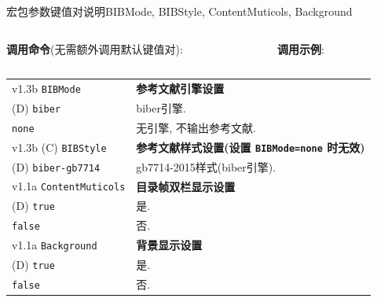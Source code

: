 \begin{frame}{ 宏包参数键值对说明}{BIBMode, BIBStyle, ContentMuticols, Background}
	\begin{columns}[T, onlytextwidth]%
		\begin{column}{.5\textwidth}
			\textbf{调用命令}(无需额外调用默认键值对):\\
		\end{column}
		\begin{column}{.5\textwidth}
			\textbf{调用示例}:\\
		\end{column}
	\end{columns}

	\begin{table}[h]
		\centering
		\begin{tabular}{>{\raggedleft\arraybackslash}p{}p{}}
			v1.3b \alert{\texttt{BIBMode}} & \textbf{参考文献引擎设置}\\
			(D) \texttt{biber} & biber引擎.\\
			\texttt{none} & 无引擎, 不输出参考文献.\\
			\midrule
			v1.3b (C) \alert{\texttt{BIBStyle}} & \textbf{参考文献样式设置(设置 \texttt{\alert{BIBMode}=none} 时无效)}\\
			(D) \texttt{biber-gb7714} & gb7714-2015样式(biber引擎).\\
			\midrule
			v1.1a \alert{\texttt{ContentMuticols}} & \textbf{目录帧双栏显示设置}\\
			(D) \texttt{true} & 是.\\
			\texttt{false} & 否.\\
			\midrule
			v1.1a \alert{\texttt{Background}} & \textbf{背景显示设置}\\
			(D) \texttt{true} & 是.\\
			\texttt{false} & 否.\\
		\end{tabular}
	\end{table}
\end{frame}

